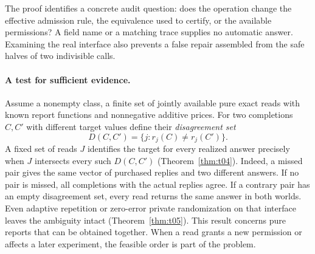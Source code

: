 The proof identifies a concrete audit question: does the operation change the effective admission rule, the equivalence used to certify, or the available permissions? A field name or a matching trace supplies no automatic answer. Examining the real interface also prevents a false repair assembled from the safe halves of two indivisible calls.

\paragraph{A test for sufficient evidence.}
Assume a nonempty class, a finite set of jointly available pure exact reads with known report functions and nonnegative additive prices. For two completions \(C,C'\) with different target values define their \emph{disagreement set}
\[
 D(C,C')=\{j:r_j(C)\ne r_j(C')\}.
\]
A fixed set of reads \(J\) identifies the target for every realized answer precisely when \(J\) intersects every such \(D(C,C')\) (Theorem~\ref{thm:t04}). Indeed, a missed pair gives the same vector of purchased replies and two different answers. If no pair is missed, all completions with the actual replies agree. If a contrary pair has an empty disagreement set, every read returns the same answer in both worlds. Even adaptive repetition or zero-error private randomization on that interface leaves the ambiguity intact (Theorem~\ref{thm:t05}). This result concerns pure reports that can be obtained together. When a read grants a new permission or affects a later experiment, the feasible order is part of the problem.
